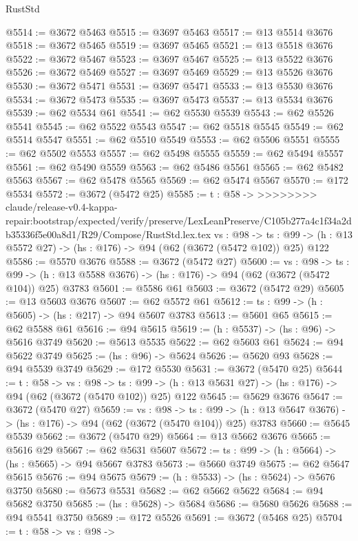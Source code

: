 \begin{lexlean}{RustStd}
\begin{coremodule}
{\begin{coremodule}
{{{{{{{{{@5514 := @3672 @5463
@5515 := @3697 @5463
@5517 := @13 @5514 @3676
@5518 := @3672 @5465
@5519 := @3697 @5465
@5521 := @13 @5518 @3676
@5522 := @3672 @5467
@5523 := @3697 @5467
@5525 := @13 @5522 @3676
@5526 := @3672 @5469
@5527 := @3697 @5469
@5529 := @13 @5526 @3676
@5530 := @3672 @5471
@5531 := @3697 @5471
@5533 := @13 @5530 @3676
@5534 := @3672 @5473
@5535 := @3697 @5473
@5537 := @13 @5534 @3676
@5539 := @62 @5534 @61
@5541 := @62 @5530 @5539
@5543 := @62 @5526 @5541
@5545 := @62 @5522 @5543
@5547 := @62 @5518 @5545
@5549 := @62 @5514 @5547
@5551 := @62 @5510 @5549
@5553 := @62 @5506 @5551
@5555 := @62 @5502 @5553
@5557 := @62 @5498 @5555
@5559 := @62 @5494 @5557
@5561 := @62 @5490 @5559
@5563 := @62 @5486 @5561
@5565 := @62 @5482 @5563
@5567 := @62 @5478 @5565
@5569 := @62 @5474 @5567
@5570 := @172 @5534
@5572 := @3672 (@5472 @25)
@5585 := {t : @58} ->
>>>>>>>> claude/release-v0.4-kappa-repair:bootstrap/expected/verify/preserve/LexLeanPreserve/C105b277a4c1f34a2db35336f5e00a8d1/R29/Compose/RustStd.lex.tex
  {vs : @98} ->
  {ts : @99} -> (h : @13 @5572 @27) -> (hs : @176) -> @94 (@62 (@3672 (@5472 @102)) @25) @122
@5586 := @5570 @3676
@5588 := @3672 (@5472 @27)
@5600 := {vs : @98} ->
  {ts : @99} -> (h : @13 @5588 @3676) -> (hs : @176) -> @94 (@62 (@3672 (@5472 @104)) @25) @3783
@5601 := @5586 @61
@5603 := @3672 (@5472 @29)
@5605 := @13 @5603 @3676
@5607 := @62 @5572 @61
@5612 := {ts : @99} -> (h : @5605) -> (hs : @217) -> @94 @5607 @3783
@5613 := @5601 @65
@5615 := @62 @5588 @61
@5616 := @94 @5615
@5619 := (h : @5537) -> (hs : @96) -> @5616 @3749
@5620 := @5613 @5535
@5622 := @62 @5603 @61
@5624 := @94 @5622 @3749
@5625 := (hs : @96) -> @5624
@5626 := @5620 @93
@5628 := @94 @5539 @3749
@5629 := @172 @5530
@5631 := @3672 (@5470 @25)
@5644 := {t : @58} ->
  {vs : @98} ->
  {ts : @99} -> (h : @13 @5631 @27) -> (hs : @176) -> @94 (@62 (@3672 (@5470 @102)) @25) @122
@5645 := @5629 @3676
@5647 := @3672 (@5470 @27)
@5659 := {vs : @98} ->
  {ts : @99} -> (h : @13 @5647 @3676) -> (hs : @176) -> @94 (@62 (@3672 (@5470 @104)) @25) @3783
@5660 := @5645 @5539
@5662 := @3672 (@5470 @29)
@5664 := @13 @5662 @3676
@5665 := @5616 @29
@5667 := @62 @5631 @5607
@5672 := {ts : @99} -> (h : @5664) -> (hs : @5665) -> @94 @5667 @3783
@5673 := @5660 @3749
@5675 := @62 @5647 @5615
@5676 := @94 @5675
@5679 := (h : @5533) -> (hs : @5624) -> @5676 @3750
@5680 := @5673 @5531
@5682 := @62 @5662 @5622
@5684 := @94 @5682 @3750
@5685 := (hs : @5628) -> @5684
@5686 := @5680 @5626
@5688 := @94 @5541 @3750
@5689 := @172 @5526
@5691 := @3672 (@5468 @25)
@5704 := {t : @58} ->
  {vs : @98} ->
}}}}}}}}}
\end{coremodule}}
\end{coremodule}
\end{lexlean}

